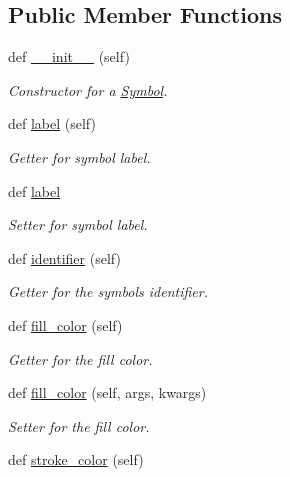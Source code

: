 \subsection*{Public Member Functions}
\begin{DoxyCompactItemize}
\item 
def \mbox{\hyperlink{classbridges_1_1symbol_1_1_symbol_a57c7fcd41baccb9c2e15c9c828d957f6}{\+\_\+\+\_\+init\+\_\+\+\_\+}} (self)
\begin{DoxyCompactList}\small\item\em Constructor for a \mbox{\hyperlink{classbridges_1_1symbol_1_1_symbol}{Symbol}}. \end{DoxyCompactList}\item 
def \mbox{\hyperlink{classbridges_1_1symbol_1_1_symbol_a6e29aa07da4ce5b13130ada2688685fc}{label}} (self)
\begin{DoxyCompactList}\small\item\em Getter for symbol label. \end{DoxyCompactList}\item 
def \mbox{\hyperlink{classbridges_1_1symbol_1_1_symbol_a44d41804267e94598d0a29ca1a29c3b1}{label}}
\begin{DoxyCompactList}\small\item\em Setter for symbol label. \end{DoxyCompactList}\item 
def \mbox{\hyperlink{classbridges_1_1symbol_1_1_symbol_ab6701b43acd3e24077b1bc385b35fdf1}{identifier}} (self)
\begin{DoxyCompactList}\small\item\em Getter for the symbols identifier. \end{DoxyCompactList}\item 
def \mbox{\hyperlink{classbridges_1_1symbol_1_1_symbol_a1a5e9147e426fb7ec74fe60a5cdc9ded}{fill\+\_\+color}} (self)
\begin{DoxyCompactList}\small\item\em Getter for the fill color. \end{DoxyCompactList}\item 
def \mbox{\hyperlink{classbridges_1_1symbol_1_1_symbol_acec37468f0018db1416622062983eb46}{fill\+\_\+color}} (self, args, kwargs)
\begin{DoxyCompactList}\small\item\em Setter for the fill color. \end{DoxyCompactList}\item 
def \mbox{\hyperlink{classbridges_1_1symbol_1_1_symbol_ab7aef566eaf9624f6adc0ae1d5768b5b}{stroke\+\_\+color}} (self)

\end{DoxyCompactItemize}
